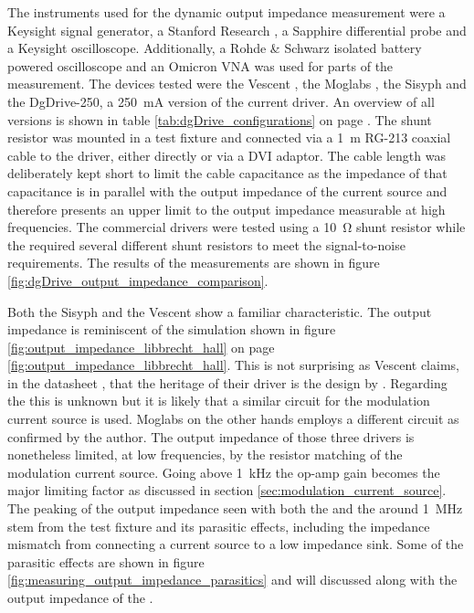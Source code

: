 The instruments used for the dynamic output impedance measurement were a Keysight  signal generator, a Stanford Research  \cite{datasheet_SR560}, a Sapphire  differential probe and a Keysight  oscilloscope. Additionally, a Rohde \& Schwarz  \cite{datasheet_RTH1004} isolated battery powered oscilloscope and an Omicron  \cite{datasheet_bode100} VNA was used for parts of the measurement. The devices tested were the Vescent , the Moglabs , the Sisyph  and the DgDrive-250, a \qty{250}{\mA} version of the current driver. An overview of all versions is shown in table \ref{tab:dgDrive_configurations} on page \pageref{tab:dgDrive_configurations}. The shunt resistor was mounted in a test fixture and connected via a \qty{1}{\m} RG-213 coaxial cable to the driver, either directly or via a DVI adaptor. The cable length was deliberately kept short to limit the cable capacitance as the impedance of that capacitance is in parallel with the output impedance of the current source and therefore presents an upper limit to the output impedance measurable at high frequencies. The commercial drivers were tested using a \qty{10}{\ohm} shunt resistor while the  required several different shunt resistors to meet the signal-to-noise requirements. The results of the measurements are shown in figure \ref{fig:dgDrive_output_impedance_comparison}.

Both the Sisyph  and the Vescent  show a familiar characteristic. The output impedance is reminiscent of the simulation shown in figure \ref{fig:output_impedance_libbrecht_hall} on page \ref{fig:output_impedance_libbrecht_hall}. This is not surprising as Vescent claims, in the datasheet \cite{datasheet_vescent_laser_driver}, that the heritage of their driver is the design by \citeauthor{libbrecht_hall} \cite{libbrecht_hall}. Regarding the  this is unknown but it is likely that a similar circuit for the modulation current source is used. Moglabs on the other hands employs a different circuit as confirmed by the author. The output impedance of those three drivers is nonetheless limited, at low frequencies, by the resistor matching of the modulation current source. Going above \qty{1}{\kHz} the op-amp gain becomes the major limiting factor as discussed in section \ref{sec:modulation_current_source}. The peaking of the output impedance seen with both the  and the  around \qty{1}{\MHz} stem from the test fixture and its parasitic effects, including the impedance mismatch from connecting a current source to a low impedance sink. Some of the parasitic effects are shown in figure \ref{fig:measuring_output_impedance_parasitics} and will discussed along with the output impedance of the .

